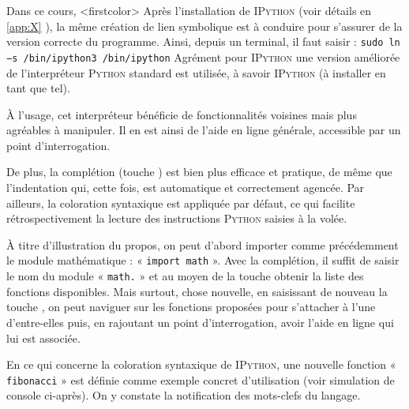 Dans ce cours,%
\caution[t]<firstcolor>{%
Après l'installation de \textsc{IPython} (voir détails en \cref{app:X} ), la même création de lien symbolique est à conduire pour s'assurer de la version correcte du programme. Ainsi, depuis un terminal, il faut saisir :
\texttt{sudo ln −s /bin/ipython3 /bin/ipython}
}%
{Agrément pour \textsc{IPython}}
une version améliorée de l'interpréteur \textsc{Python} standard est utilisée, à savoir \textsc{IPython} (à installer en tant que tel).

À l'usage, cet interpréteur bénéficie de fonctionnalités voisines mais plus agréables à manipuler. Il en est ainsi de l'aide en ligne générale, accessible par un point d'interrogation. 

De plus, la complétion (touche ) est bien plus efficace et pratique, de même que l'indentation qui, cette fois, est automatique et correctement agencée. Par ailleurs, la coloration syntaxique est appliquée par défaut, ce qui facilite rétrospectivement la lecture des instructions \textsc{Python} saisies à la volée.

À titre d'illustration du propos, on peut d'abord importer comme précédemment le module mathématique : « \texttt{import math} ». Avec la complétion, il suffit de saisir le nom du module « \texttt{math.} » et au moyen de la touche  obtenir la liste des fonctions disponibles. Mais surtout, chose nouvelle, en saisissant de nouveau la touche , on peut naviguer sur les fonctions proposées pour s'attacher à l'une d'entre-elles puis, en rajoutant un point d'interrogation, avoir l'aide en ligne qui lui est associée.

En ce qui concerne la coloration syntaxique de \textsc{IPython}, une nouvelle fonction « \texttt{fibonacci} » est définie comme exemple concret d'utilisation (voir simulation de console ci-après). On y constate la notification des mots-clefs du langage.

\vspace*{4pt}

